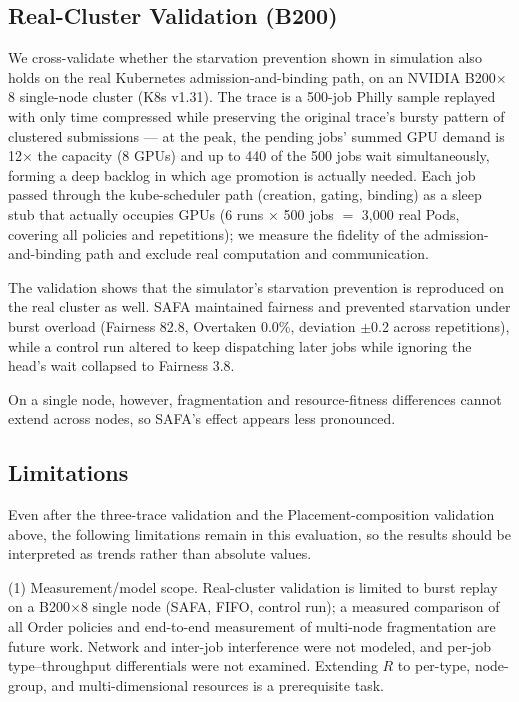 \documentclass{ieeetj}
\begin{document}
\subsection{Real-Cluster Validation (B200)}\label{eval:b200}
We cross-validate whether the starvation prevention shown in simulation also holds on the real Kubernetes admission-and-binding path, on an NVIDIA B200$\times$8 single-node cluster (K8s v1.31). The trace is a 500-job Philly sample replayed with only time compressed while preserving the original trace's bursty pattern of clustered submissions --- at the peak, the pending jobs' summed GPU demand is 12$\times$ the capacity (8 GPUs) and up to 440 of the 500 jobs wait simultaneously, forming a deep backlog in which age promotion is actually needed. Each job passed through the kube-scheduler path (creation, gating, binding) as a sleep stub that actually occupies GPUs (6 runs $\times$ 500 jobs $=$ 3{,}000 real Pods, covering all policies and repetitions); we measure the fidelity of the admission-and-binding path and exclude real computation and communication.

The validation shows that the simulator's starvation prevention is reproduced on the real cluster as well. SAFA maintained fairness and prevented starvation under burst overload (Fairness 82.8, Overtaken 0.0\%, deviation $\pm$0.2 across repetitions), while a control run altered to keep dispatching later jobs while ignoring the head's wait collapsed to Fairness 3.8.

On a single node, however, fragmentation and resource-fitness differences cannot extend across nodes, so SAFA's effect appears less pronounced.

\subsection{Limitations}\label{eval:threats}
Even after the three-trace validation and the Placement-composition validation above, the following limitations remain in this evaluation, so the results should be interpreted as trends rather than absolute values.

(1) Measurement/model scope. Real-cluster validation is limited to burst replay on a B200$\times$8 single node (SAFA, FIFO, control run); a measured comparison of all Order policies and end-to-end measurement of multi-node fragmentation are future work. Network and inter-job interference were not modeled, and per-job type--throughput differentials were not examined. Extending $R$ to per-type, node-group, and multi-dimensional resources is a prerequisite task.
\end{document}
